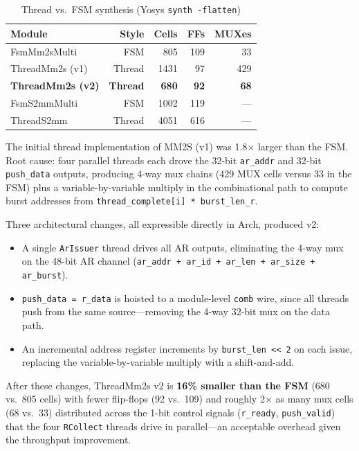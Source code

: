 \documentclass[manuscript]{acmart}
\begin{document}
\begin{table}[H]
\centering
\caption{Thread vs.\ FSM synthesis (Yosys \texttt{synth -flatten})}
\label{tab:threadvsfsm}
\footnotesize
\setlength{\tabcolsep}{4pt}
\begin{tabular}{@{}lrrrr@{}}
\toprule
\textbf{Module} & \textbf{Style} & \textbf{Cells} & \textbf{FFs} & \textbf{MUXes} \\
\midrule
FsmMm2sMulti          & FSM          & 805  & 109 & 33  \\
ThreadMm2s (v1)       & Thread       & 1431 & 97  & 429 \\
\textbf{ThreadMm2s (v2)} & \textbf{Thread} & \textbf{680}  & \textbf{92}  & \textbf{68}  \\
\midrule
FsmS2mmMulti          & FSM          & 1002 & 119 & --- \\
ThreadS2mm            & Thread       & 4051 & 616 & --- \\
\bottomrule
\end{tabular}
\end{table}

The initial thread implementation of MM2S (v1) was 1.8$\times$ larger than the FSM. Root cause: four parallel threads each drove the 32-bit \texttt{ar\_addr} and 32-bit \texttt{push\_data} outputs, producing 4-way mux chains (429 MUX cells versus 33 in the FSM) plus a variable-by-variable multiply in the combinational path to compute burst addresses from \texttt{thread\_complete[i] * burst\_len\_r}.

Three architectural changes, all expressible directly in Arch, produced v2:

\begin{itemize}
\item A single \texttt{ArIssuer} thread drives all AR outputs, eliminating the 4-way mux on the 48-bit AR channel (\texttt{ar\_addr + ar\_id + ar\_len + ar\_size + ar\_burst}).
\item \texttt{push\_data = r\_data} is hoisted to a module-level \texttt{comb} wire, since all threads push from the same source---removing the 4-way 32-bit mux on the data path.
\item An incremental address register increments by \texttt{burst\_len << 2} on each issue, replacing the variable-by-variable multiply with a shift-and-add.
\end{itemize}

After these changes, ThreadMm2s v2 is \textbf{16\% smaller than the FSM} (680 vs.\ 805 cells) with fewer flip-flops (92 vs.\ 109) and roughly 2$\times$ as many mux cells (68 vs.\ 33) distributed across the 1-bit control signals (\texttt{r\_ready}, \texttt{push\_valid}) that the four \texttt{RCollect} threads drive in parallel---an acceptable overhead given the throughput improvement.
\end{document}
